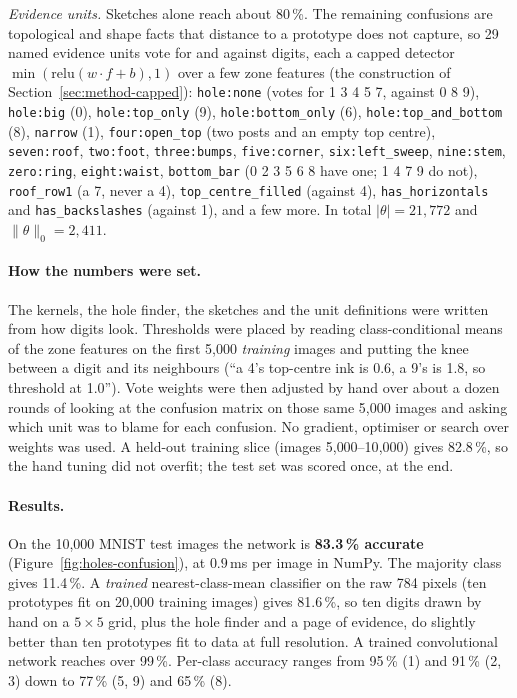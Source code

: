 \emph{Evidence units.} Sketches alone reach about 80\,\%. The remaining confusions are
topological and shape facts that distance to a prototype does not capture, so 29 named
evidence units vote for and against digits, each a capped detector
$\min(\mathrm{relu}(w\cdot f+b),1)$ over a few zone features (the construction of
Section~\ref{sec:method-capped}): \texttt{hole:none} (votes for 1 3 4 5 7, against 0 8
9), \texttt{hole:big} (0), \texttt{hole:top\_only} (9), \texttt{hole:bottom\_only} (6),
\texttt{hole:top\_and\_bottom} (8), \texttt{narrow} (1), \texttt{four:open\_top} (two posts
and an empty top centre), \texttt{seven:roof}, \texttt{two:foot}, \texttt{three:bumps},
\texttt{five:corner}, \texttt{six:left\_sweep}, \texttt{nine:stem}, \texttt{zero:ring},
\texttt{eight:waist}, \texttt{bottom\_bar} (0 2 3 5 6 8 have one; 1 4 7 9 do not),
\texttt{roof\_row1} (a 7, never a 4), \texttt{top\_centre\_filled} (against 4),
\texttt{has\_horizontals} and \texttt{has\_backslashes} (against 1), and a few more.
In total $|\theta|=21{,}772$ and $\|\theta\|_0=2{,}411$.

\paragraph{How the numbers were set.} The kernels, the hole finder, the sketches and the
unit definitions were written from how digits look. Thresholds were placed by reading
class-conditional means of the zone features on the first 5{,}000 \emph{training} images
and putting the knee between a digit and its neighbours (``a 4's top-centre ink is 0.6, a
9's is 1.8, so threshold at 1.0''). Vote weights were then adjusted by hand over about a
dozen rounds of looking at the confusion matrix on those same 5{,}000 images and asking
which unit was to blame for each confusion. No gradient, optimiser or search over weights
was used. A held-out training slice (images 5{,}000--10{,}000) gives 82.8\,\%, so the hand
tuning did not overfit; the test set was scored once, at the end.

\paragraph{Results.} On the 10{,}000 MNIST test images the network is \textbf{83.3\,\%
accurate} (Figure~\ref{fig:holes-confusion}), at $0.9$\,ms per image in NumPy. The
majority class gives 11.4\,\%. A \emph{trained} nearest-class-mean classifier on the raw
784 pixels (ten prototypes fit on 20{,}000 training images) gives 81.6\,\%, so ten digits
drawn by hand on a $5\times5$ grid, plus the hole finder and a page of evidence, do
slightly better than ten prototypes fit to data at full resolution. A trained
convolutional network reaches over 99\,\%. Per-class accuracy ranges from 95\,\% (1) and
91\,\% (2, 3) down to 77\,\% (5, 9) and 65\,\% (8).

